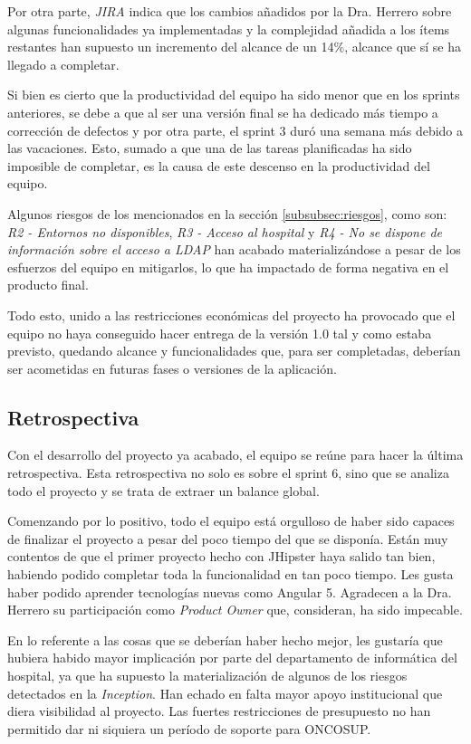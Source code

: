 Por otra parte, \emph{JIRA} indica que los cambios añadidos por la Dra. Herrero sobre algunas funcionalidades ya implementadas y la complejidad añadida a los ítems restantes han supuesto un incremento del alcance de un 14\%, alcance que sí se ha llegado a completar.

Si bien es cierto que la productividad del equipo ha sido menor que en los sprints anteriores, se debe a que al ser una versión final se ha dedicado más tiempo a corrección de defectos y por otra parte, el sprint 3 duró una semana más debido a las vacaciones. Esto, sumado a que una de las tareas planificadas ha sido imposible de completar, es la causa de este descenso en la productividad del equipo.

Algunos riesgos de los mencionados en la sección \ref{subsubsec:riesgos}, como son: \emph{R2 - Entornos no disponibles}, \emph{R3 - Acceso al hospital} y \emph{R4 - No se dispone de información sobre el acceso a LDAP} han acabado materializándose a pesar de los esfuerzos del equipo en mitigarlos, lo que ha impactado de forma negativa en el producto final.

Todo esto, unido a las restricciones económicas del proyecto ha provocado que el equipo no haya conseguido hacer entrega de la versión 1.0 tal y como estaba previsto, quedando alcance y funcionalidades que, para ser completadas, deberían ser acometidas en futuras fases o versiones de la aplicación.

\subsection{Retrospectiva}
\label{subsec:S6-Retrospectiva}

Con el desarrollo del proyecto ya acabado, el equipo se reúne para hacer la última retrospectiva. Esta retrospectiva no solo es sobre el sprint 6, sino que se analiza todo el proyecto y se trata de extraer un balance global.

Comenzando por lo positivo, todo el equipo está orgulloso de haber sido capaces de finalizar el proyecto a pesar del poco tiempo del que se disponía. Están muy contentos de que el primer proyecto hecho con JHipster haya salido tan bien, habiendo podido completar toda la funcionalidad en tan poco tiempo. Les gusta haber podido aprender tecnologías nuevas como Angular 5. Agradecen a la Dra. Herrero su participación como \emph{Product Owner} que, consideran, ha sido impecable.

En lo referente a las cosas que se deberían haber hecho mejor, les gustaría que hubiera habido mayor implicación por parte del departamento de informática del hospital, ya que ha supuesto la materialización de algunos de los riesgos detectados en la \emph{Inception}. Han echado en falta mayor apoyo institucional que diera visibilidad al proyecto. Las fuertes restricciones de presupuesto no han permitido dar ni siquiera un período de soporte para ONCOSUP.

